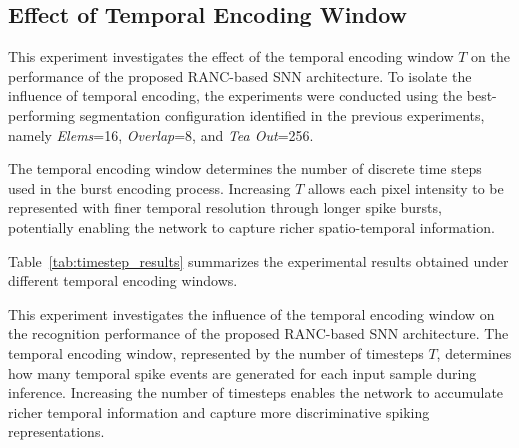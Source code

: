 \documentclass[../main.tex]{subfiles}
\begin{document}
\subsection{Effect of Temporal Encoding Window}

This experiment investigates the effect of the temporal encoding window \(T\) on the performance of the proposed RANC-based SNN architecture. To isolate the influence of temporal encoding, the experiments were conducted using the best-performing segmentation configuration identified in the previous experiments, namely \textit{Elems}=16, \textit{Overlap}=8, and \textit{Tea Out}=256.

The temporal encoding window determines the number of discrete time steps used in the burst encoding process. Increasing \(T\) allows each pixel intensity to be represented with finer temporal resolution through longer spike bursts, potentially enabling the network to capture richer spatio-temporal information.

Table~\ref{tab:timestep_results} summarizes the experimental results obtained under different temporal encoding windows.

\begin{table}[h]
\centering
\caption{Performance of the proposed RANC-based SNN under different temporal encoding windows using the best segmentation configuration (\textit{Elems}=16, \textit{Overlap}=8, \textit{Tea Out}=256).}
\end{table}

This experiment investigates the influence of the temporal encoding window on the recognition performance of the proposed RANC-based SNN architecture. The temporal encoding window, represented by the number of timesteps \(T\), determines how many temporal spike events are generated for each input sample during inference. Increasing the number of timesteps enables the network to accumulate richer temporal information and capture more discriminative spiking representations.
\end{document}

